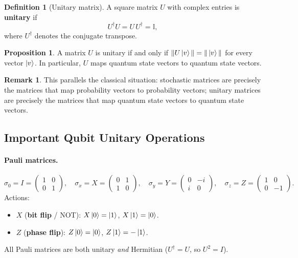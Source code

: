 \documentclass[11pt]{article}
\theoremstyle{definition}
\newtheorem{definition}{Definition}[section]
\newtheorem{remark}{Remark}[section]
\newtheorem{proposition}{Proposition}[section]
\begin{document}
\begin{definition}[Unitary matrix]
A square matrix $U$ with complex entries is \textbf{unitary} if
\[
    U^\dagger U = U\,U^\dagger = \mathbb{I},
\]
where $U^\dagger$ denotes the conjugate transpose.
\end{definition}

\begin{proposition}
A matrix $U$ is unitary if and only if $\|U\ket{v}\|=\|\ket{v}\|$ for every vector $\ket{v}$.  In particular, $U$ maps quantum state vectors to quantum state vectors.
\end{proposition}

\begin{remark}
This parallels the classical situation: stochastic matrices are precisely the matrices that map probability vectors to probability vectors; unitary matrices are precisely the matrices that map quantum state vectors to quantum state vectors.
\end{remark}

\subsection{Important Qubit Unitary Operations}

\paragraph{Pauli matrices.}
\[
    \sigma_0 = I = \begin{pmatrix}1&0\\0&1\end{pmatrix},\quad
    \sigma_x = X = \begin{pmatrix}0&1\\1&0\end{pmatrix},\quad
    \sigma_y = Y = \begin{pmatrix}0&-i\\i&0\end{pmatrix},\quad
    \sigma_z = Z = \begin{pmatrix}1&0\\0&-1\end{pmatrix}.
\]
Actions:
\begin{itemize}
    \item $X$ (\textbf{bit flip} / NOT): $X\ket{0}=\ket{1}$, $X\ket{1}=\ket{0}$.
    \item $Z$ (\textbf{phase flip}): $Z\ket{0}=\ket{0}$, $Z\ket{1}=-\ket{1}$.
\end{itemize}
All Pauli matrices are both unitary \emph{and} Hermitian ($U^\dagger=U$, so $U^2=I$).
\end{document}
